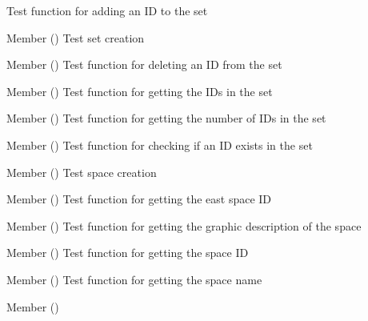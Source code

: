\begin{DoxyRefList}
%
Test function for adding an ID to the set  
\item[Member \doxylink{set__test_8h_a6f654ab4b44e8a9b9cedfb78c378a5d7}{test1\+\_\+set\+\_\+create} ()]\label{test__test000105}%
%
Test set creation  
\item[Member \doxylink{set__test_8h_a2a15d0c24e7a943dec28b6d8e3850e60}{test1\+\_\+set\+\_\+del} ()]\label{test__test000109}%
%
Test function for deleting an ID from the set  
\item[Member \doxylink{set__test_8h_a5121f8a96087a7f941ffb785d3f826c9}{test1\+\_\+set\+\_\+get\+\_\+ids} ()]\label{test__test000116}%
%
Test function for getting the IDs in the set  
\item[Member \doxylink{set__test_8h_afb7f07cdc826f4f6ac3c017aafe15a0c}{test1\+\_\+set\+\_\+get\+\_\+nids} ()]\label{test__test000111}%
%
Test function for getting the number of IDs in the set  
\item[Member \doxylink{set__test_8h_aaed9de7851dbd12ad6bf06e5daaf0944}{test1\+\_\+set\+\_\+id\+\_\+is\+\_\+there} ()]\label{test__test000114}%
%
Test function for checking if an ID exists in the set  
\item[Member \doxylink{space__test_8h_a69278cc022dc5688d4725f8d36317b30}{test1\+\_\+space\+\_\+create} ()]\label{test__test000118}%
%
Test space creation  
\item[Member \doxylink{space__test_8h_a354adb2722b06ec65b7212d2736d6417}{test1\+\_\+space\+\_\+get\+\_\+east} ()]\label{test__test000145}%
%
Test function for getting the east space ID  
\item[Member \doxylink{space__test_8h_a3b6d16613ee2f3940fe7c92f3934508a}{test1\+\_\+space\+\_\+get\+\_\+gdesc} ()]\label{test__test000153}%
%
Test function for getting the graphic description of the space  
\item[Member \doxylink{space__test_8h_a920df9e02482f4f1e6a5ebcaec523860}{test1\+\_\+space\+\_\+get\+\_\+id} ()]\label{test__test000137}%
%
Test function for getting the space ID  
\item[Member \doxylink{space__test_8h_ad12c42523c517507566c5c68b1527689}{test1\+\_\+space\+\_\+get\+\_\+name} ()]\label{test__test000139}%
%
Test function for getting the space name  
\item[Member \doxylink{space__test_8h_aaa2825051ff151f14710b40a1b4518ad}{test1\+\_\+space\+\_\+get\+\_\+nobjects} ()]\label{test__test000149}%

\end{DoxyRefList}

